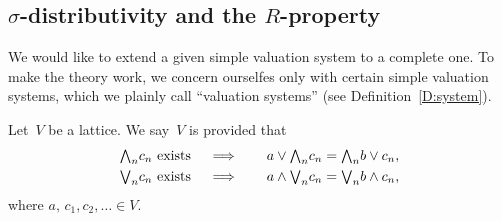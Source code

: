\documentclass[main.tex]{subfiles}
\begin{document}
\subsection{$\sigma$-distributivity and the $R$-property}
We would like to
extend a given simple valuation system to a complete one.
To make the theory work,
we concern ourselfes only with certain
simple valuation systems,
which we plainly call ``valuation systems'' (see Definition~\ref{D:system}).
%
% 
\begin{dfn}
Let~$V$ be a lattice.
We say~$V$ is
provided that
\begin{alignat*}{3}
\textstyle{\bigwedge}_n c_n\text{ exists} \quad&\implies\quad
&a \vee \textstyle{\bigwedge}_n c_n &= \textstyle{\bigwedge}_n b\vee c_n, \\
\textstyle{\bigvee}_n c_n\text{ exists} \quad&\implies\quad
&a \wedge \textstyle{\bigvee}_n c_n &= \textstyle{\bigvee}_n b\wedge c_n,
\end{alignat*}
where $a,\,c_1,c_2,\dotsc\in V$.
\end{dfn}
\end{document}
